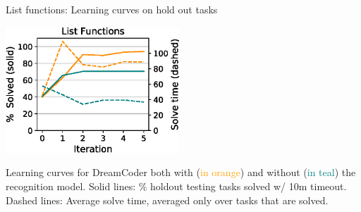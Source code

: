 \documentclass{beamer}
\newcommand{\orange}[1]{\textcolor{orange}{#1}}
\newcommand{\teal}[1]{\textcolor{teal}{#1}}
\begin{document}
\begin{frame}{List functions: Learning curves on hold out tasks}

  \begin{center}
      \includegraphics[width = 6.5cm]{figures/listLearningCurve.eps} 
    \end{center}

Learning curves for DreamCoder both with (\orange{in orange}) and without
    (\teal{in teal}) the recognition model. Solid lines: \% holdout testing tasks solved w/ 10m timeout. Dashed lines: Average solve time, averaged only over tasks that are solved.


  \end{frame}




  


\end{document}
